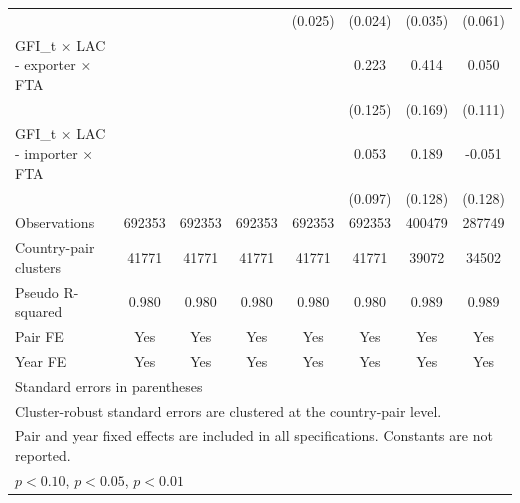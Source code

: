 \begin{table}[htbp]
\begin{tabular}{l*{7}{c}}
          &                  &                  &                  &  (0.025)         &  (0.024)         &  (0.035)         &  (0.061)         \\
[1em]
GFI\_t × LAC - exporter × FTA&                  &                  &                  &                  &    0.223\sym{*}  &    0.414\sym{**} &    0.050         \\
          &                  &                  &                  &                  &  (0.125)         &  (0.169)         &  (0.111)         \\
[1em]
GFI\_t × LAC - importer × FTA&                  &                  &                  &                  &    0.053         &    0.189         &   -0.051         \\
          &                  &                  &                  &                  &  (0.097)         &  (0.128)         &  (0.128)         \\
\hline
Observations&   692353         &   692353         &   692353         &   692353         &   692353         &   400479         &   287749         \\
Country-pair clusters&    41771         &    41771         &    41771         &    41771         &    41771         &    39072         &    34502         \\
Pseudo R-squared&    0.980         &    0.980         &    0.980         &    0.980         &    0.980         &    0.989         &    0.989         \\
Pair FE   &      Yes         &      Yes         &      Yes         &      Yes         &      Yes         &      Yes         &      Yes         \\
Year FE   &      Yes         &      Yes         &      Yes         &      Yes         &      Yes         &      Yes         &      Yes         \\
\hline\hline
\multicolumn{8}{l}{\footnotesize Standard errors in parentheses}\\
\multicolumn{8}{l}{\footnotesize Cluster-robust standard errors are clustered at the country-pair level.}\\
\multicolumn{8}{l}{\footnotesize Pair and year fixed effects are included in all specifications. Constants are not reported.}\\
\multicolumn{8}{l}{\footnotesize \sym{*} \(p<0.10\), \sym{**} \(p<0.05\), \sym{***} \(p<0.01\)}\\
\end{tabular}
\end{table}
